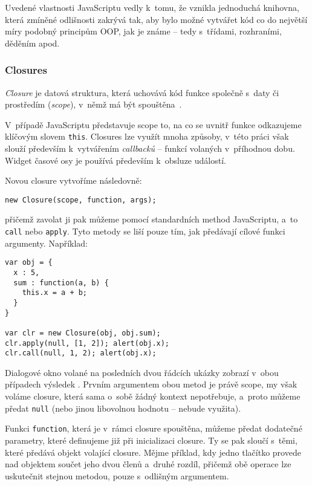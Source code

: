 		Uvedené vlastnosti JavaScriptu vedly k~tomu, že vznikla jednoduchá knihovna, která zmíněné odlišnosti zakrývá tak, aby bylo možné vytvářet kód co do největší míry podobný principům OOP, jak je známe -- tedy s~třídami, rozhraními, dě\-děním apod.
		
		\subsubsection*{Closures}
			\begin{mydef}
				\emph{Closure} je datová struktura, která uchovává kód funkce společně s~daty či prostředím (\emph{scope}), v~němž má být spouštěna~\cite{soshnikov}.
			\end{mydef}
		 V~případě JavaScriptu představuje scope to, na co se uvnitř funkce odkazujeme klíčovým slovem {\tt this}. Closures lze využít mnoha způsoby, v~této práci však slouží především k~vytvářením \emph{callbacků} -- funkcí volaných v~příhodnou dobu. Widget časové osy je používá především k~obsluze událostí.
			
			Novou closure vytvoříme následovně:
			\begin{verbatim}new Closure(scope, function, args);\end{verbatim}
			přičemž zavolat ji pak můžeme pomocí standardních method JavaScriptu, a~to {\tt call} nebo {\tt apply}. Tyto metody se liší pouze tím, jak předávají cílové funkci argumenty. Například:
			\begin{verbatim}
var obj = {
  x : 5, 
  sum : function(a, b) {
    this.x = a + b;
  }
}

var clr = new Closure(obj, obj.sum);
clr.apply(null, [1, 2]); alert(obj.x);
clr.call(null, 1, 2); alert(obj.x);

			\end{verbatim}
			Dialogové okno volané na posledních dvou řádcích ukázky zobrazí v~obou přípa\-dech výsledek {}. Prvním argumentem obou metod je právě scope, my však voláme closure, která sama o~sobě žádný kontext nepotřebuje, a~proto můžeme předat {\tt null} (nebo jinou libovolnou hodnotu -- nebude využita).
			
			Funkci {\tt function}, která je v~rámci closure spouštěna, můžeme předat dodatečné parametry, které definujeme již při inicializaci closure. Ty se pak sloučí s~těmi, které předává objekt volající closure. Mějme příklad, kdy jedno tlačítko provede nad objektem součet jeho dvou členů a~druhé rozdíl, přičemž obě operace lze uskutečnit stejnou metodou, pouze s~odlišným argumentem.
			
